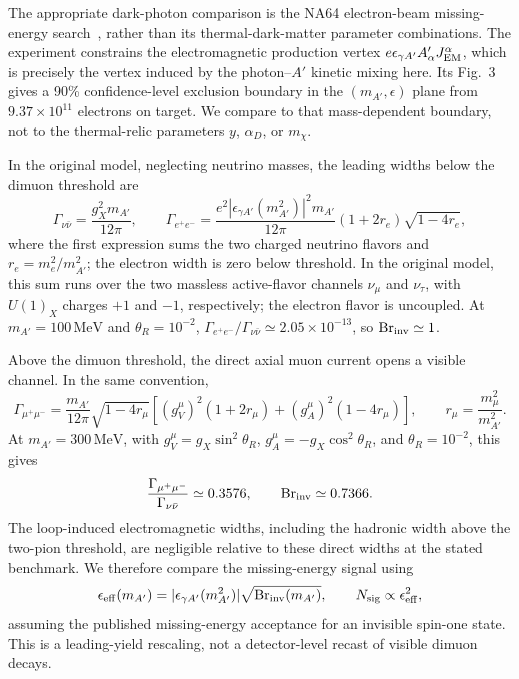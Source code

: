 \documentclass[12pt,a4paper]{article}
\begin{document}
\medskip
{}

The appropriate dark-photon comparison is the NA64 electron-beam missing-energy search~\cite{NA64:2023lightDM}, rather than its thermal-dark-matter parameter combinations. The experiment constrains the electromagnetic production vertex \(e\epsilon_{\gamma A'}A'_\alpha J_{\rm EM}^\alpha\), which is precisely the vertex induced by the photon--\(A'\) kinetic mixing here. Its Fig.~3 gives a 90\% confidence-level exclusion boundary in the \((m_{A'},\epsilon)\) plane from \(9.37\times10^{11}\) electrons on target. We compare to that mass-dependent boundary, not to the thermal-relic parameters \(y\), \(\alpha_D\), or \(m_\chi\).

In the original model, neglecting neutrino masses, the leading widths below the dimuon threshold are
\[
\Gamma_{\nu\bar\nu}=\frac{g_X^2m_{A'}}{12\pi},
\qquad
\Gamma_{e^+e^-}=\frac{e^2|\epsilon_{\gamma A'}(m_{A'}^2)|^2m_{A'}}{12\pi}
(1+2r_e)\sqrt{1-4r_e},
\]
where the first expression sums the two charged neutrino flavors and \(r_e=m_e^2/m_{A'}^2\); the electron width is zero below threshold. In the original model, this sum runs over the two massless active-flavor channels \(\nu_\mu\) and \(\nu_\tau\), with \(U(1)_X\) charges \(+1\) and \(-1\), respectively; the electron flavor is uncoupled. At \(m_{A'}=100\,\mathrm{MeV}\) and \(\theta_R=10^{-2}\), \(\Gamma_{e^+e^-}/\Gamma_{\nu\bar\nu}\simeq2.05\times10^{-13}\), so \(\operatorname{Br}_{\rm inv}\simeq1\).

Above the dimuon threshold, the direct axial muon current opens a visible channel. In the same convention,
\[
\Gamma_{\mu^+\mu^-}
=\frac{m_{A'}}{12\pi}\sqrt{1-4r_\mu}
\left[(g_V^\mu)^2(1+2r_\mu)+(g_A^\mu)^2(1-4r_\mu)\right],
\qquad r_\mu=\frac{m_\mu^2}{m_{A'}^2}.
\]
At \(m_{A'}=300\,\mathrm{MeV}\), with \(g_V^\mu=g_X\sin^2\theta_R\), \(g_A^\mu=-g_X\cos^2\theta_R\), and \(\theta_R=10^{-2}\), this gives
\[
\frac{\Gamma_{\mu^+\mu^-}}{\Gamma_{\nu\bar\nu}}\simeq0.3576,
\qquad
\operatorname{Br}_{\rm inv}\simeq0.7366.
\]
The loop-induced electromagnetic widths, including the hadronic width above the two-pion threshold, are negligible relative to these direct widths at the stated benchmark. We therefore compare the missing-energy signal using
\[
\epsilon_{\rm eff}(m_{A'})
=|\epsilon_{\gamma A'}(m_{A'}^2)|
\sqrt{\operatorname{Br}_{\rm inv}(m_{A'})},
\qquad
N_{\rm sig}\propto\epsilon_{\rm eff}^2,
\]
assuming the published missing-energy acceptance for an invisible spin-one state. This is a leading-yield rescaling, not a detector-level recast of visible dimuon decays.
\end{document}
